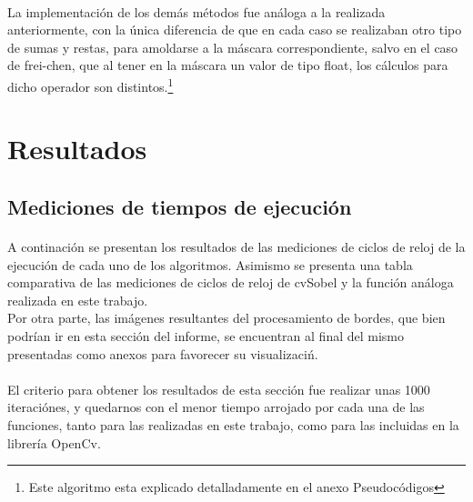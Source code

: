 \documentclass[11pt, a4paper]{article}
\begin{document}
\paragraph{}
La implementaci\'on de los dem\'as m\'etodos fue an\'aloga a la realizada anteriormente, con la \'unica diferencia de que en cada caso se realizaban otro tipo de sumas y restas, para amoldarse a la m\'ascara correspondiente, salvo en el caso de frei-chen, que al tener en la m\'ascara un valor de tipo float, los c\'alculos para dicho operador son distintos.\footnote{Este algoritmo esta explicado detalladamente en el anexo Pseudoc\'odigos}




\newpage

\section{Resultados}

\subsection{Mediciones de tiempos de ejecuci\'on}
\paragraph{}
A continaci\'on se presentan los resultados de las mediciones de ciclos de reloj de la ejecuci\'on de cada uno de los algoritmos. Asimismo se presenta una tabla comparativa de las mediciones de ciclos de reloj de cvSobel y la funci\'on an\'aloga realizada en este trabajo.\\
Por otra parte, las im\'agenes resultantes del procesamiento de bordes, que bien podr\'ian ir en esta secci\'on del informe, se encuentran al final del mismo presentadas como anexos para favorecer su visualizaci\'n.

\paragraph{}
El criterio para obtener los resultados de esta secci\'on fue realizar unas 1000 iteraci\'ones, y quedarnos con el menor tiempo arrojado por cada una de las funciones, tanto para las realizadas en este trabajo, como para las incluidas en la librer\'ia OpenCv.

\vspace{1cm}
\end{document}
